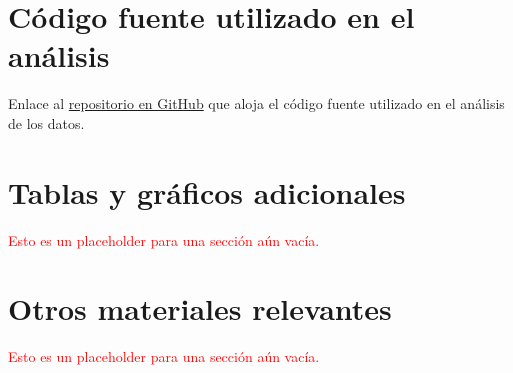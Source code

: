 \documentclass[a4paper]{report}
\begin{document}
\section{Código fuente utilizado en el análisis}
Enlace al \href{https://github.com/bettachini/tallerTesis/tree/main/sismosURL}{repositorio en GitHub} que aloja el código fuente utilizado en el análisis de los datos.



\section{Tablas y gráficos adicionales}
\textcolor{red}{Esto es un placeholder para una sección aún vacía.}


\section{Otros materiales relevantes}
\textcolor{red}{Esto es un placeholder para una sección aún vacía.}
\end{document}
